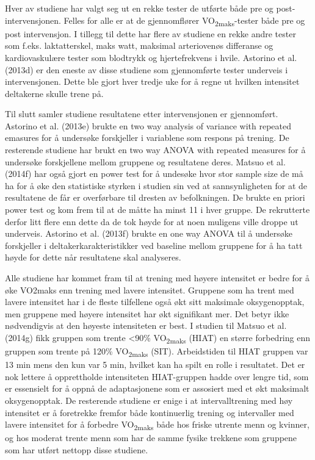 \documentclass[
  letterpaper,
  DIV=11,
  numbers=noendperiod]{scrartcl}
\begin{document}
Hver av studiene har valgt seg ut en rekke tester de utførte både pre og
post-intervensjonen. Felles for alle er at de gjennomflører
VO\textsubscript{2maks}-tester både pre og post intervensjon. I tillegg
til dette har flere av studiene en rekke andre tester som f.eks.
laktatterskel, maks watt, maksimal arteriovenøs differanse og
kardiovaskulære tester som blodtrykk og hjertefrekvens i hvile. Astorino
et al. (2013d) er den eneste av disse studiene som gjennomførte tester
underveis i intervensjonen. Dette ble gjort hver tredje uke for å regne
ut hvilken intensitet deltakerne skulle trene på.

Til slutt samler studiene resultatene etter intervensjonen er
gjennomført. Astorino et al. (2013e) brukte en two way analysis of
variance with repeated emasures for å undersøke forskjeller i variablene
som respons på trening. De resterende studiene har brukt en two way
ANOVA with repeated measures for å undersøke forskjellene mellom
gruppene og resultatene deres. Matsuo et al. (2014f) har også gjort en
power test for å undesøke hvor stor sample size de må ha for å øke den
statistiske styrken i studien sin ved at sannsynligheten for at de
resultatene de får er overførbare til dresten av befolkningen. De brukte
en priori power test og kom frem til at de måtte ha minst 11 i hver
gruppe. De rekrutterte derfor litt flere enn dette da de tok høyde for
at noen muligens ville droppe ut underveis. Astorino et al. (2013f)
brukte en one way ANOVA til å undersøke forskjeller i
deltakerkarakteristikker ved baseline mellom gruppene for å ha tatt
høyde for dette når resultatene skal analyseres.

Alle studiene har kommet fram til at trening med høyere intensitet er
bedre for å øke VO2maks enn trening med lavere intensitet. Gruppene som
ha trent med lavere intensitet har i de fleste tilfellene også økt sitt
maksimale oksygenopptak, men gruppene med høyere intensitet har økt
signifikant mer. Det betyr ikke nødvendigvis at den høyeste intensiteten
er best. I studien til Matsuo et al. (2014g) fikk gruppen som trente
\textless90\% VO\textsubscript{2maks} (HIAT) en større forbedring enn
gruppen som trente på 120\% VO\textsubscript{2maks} (SIT). Arbeidstiden
til HIAT gruppen var 13 min mens den kun var 5 min, hvilket kan ha spilt
en rolle i resultatet. Det er nok lettere å opprettholde intensiteten
HIAT-gruppen hadde over lengre tid, som er essensielt for å oppnå de
adaptasjonene som er assosiert med et økt maksimalt oksygenopptak. De
resterende studiene er enige i at intervalltrening med høy intensitet er
å foretrekke fremfor både kontinuerlig trening og intervaller med lavere
intensitet for å forbedre VO\textsubscript{2maks} både hos friske
utrente menn og kvinner, og hos moderat trente menn som har de samme
fysike trekkene som gruppene som har utført nettopp disse studiene.
\end{document}
